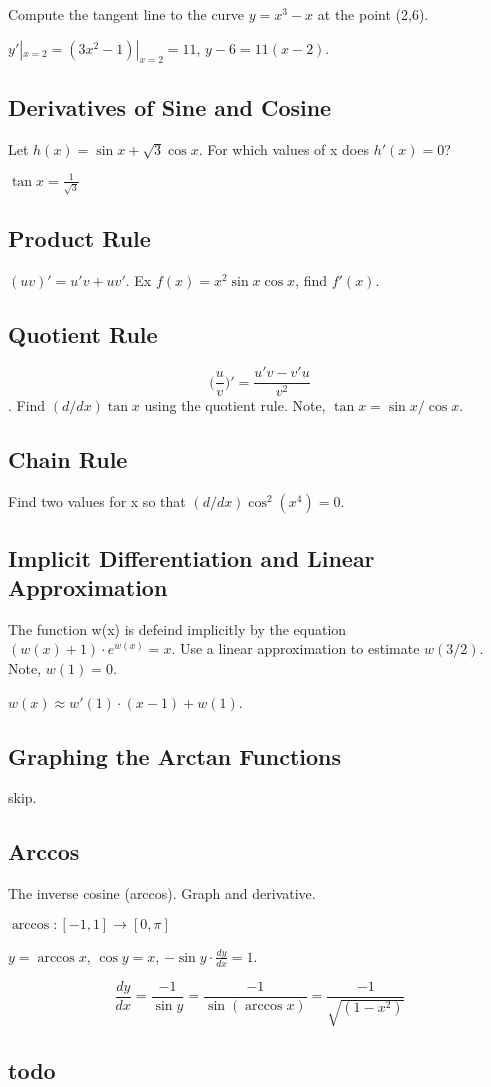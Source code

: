 Compute the tangent line to the curve $y=x^3-x$ at the point (2,6).

$ y'|_{x=2} = (3x^2-1)|_{x=2} = 11$, $y-6=11(x-2)$.

\subsection{Derivatives of Sine and Cosine}

Let $h(x)=\sin x + \sqrt{3}\cos x$. For which values of x does $h'(x)=0$?

$\tan x = \frac{1}{\sqrt{3}}$

\subsection{Product Rule}

$(uv)' = u'v + uv'$. Ex $f(x)=x^2\sin x\cos x$, find $f'(x)$.

\subsection{Quotient Rule}

$$ \Big(\frac{u}{v}\Big)' = \frac{u'v - v'u}{v^2}$$. Find $(d/dx)\tan x$
using the quotient rule. Note, $\tan x = \sin x / \cos x$.

\subsection{Chain Rule}

Find two values for x so that $(d/dx) \cos^2(x^4) = 0$.

\subsection{Implicit Differentiation and Linear Approximation}

The function w(x) is defeind implicitly by the equation
$(w(x)+1)\cdot e^{w(x)} = x$. Use a linear approximation to estimate $w(3/2)$.
Note, $w(1)=0$.

$w(x) \approx w'(1)\cdot(x-1) + w(1)$.

\subsection{Graphing the Arctan Functions}

skip.

\subsection{Arccos}

The inverse cosine (arccos). Graph and derivative.

$\arccos:[-1,1]\rightarrow[0,\pi]$

$y = \arccos x$, $\cos y = x$, $-\sin y \cdot \frac{dy}{dx} = 1$.

$$\frac{dy}{dx} = \frac{-1}{\sin y} = \frac{-1}{\sin(\arccos x)} = \frac{-1}
  {\sqrt{(1-x^2)}}$$

\subsection{todo}

